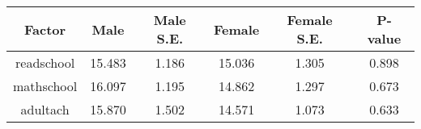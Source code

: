 \begin{longtable}{c c c c c c}
\toprule
\textbf{Factor} & \textbf{Male} & \textbf{Male S.E.}  & \textbf{Female} & \textbf{Female S.E.} & \textbf{P-value} \\
\midrule
readschool & 15.483 & 1.186 &  15.036 & 1.305 & 0.898 \\
mathschool & 16.097 & 1.195 &  14.862 & 1.297 & 0.673 \\
adultach & 15.870 & 1.502 &  14.571 & 1.073 & 0.633 \\
\bottomrule
\end{longtable}
